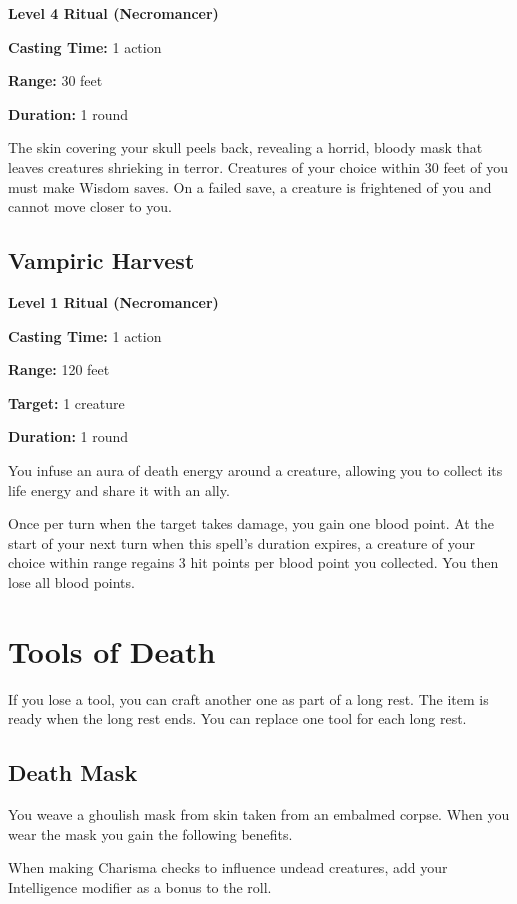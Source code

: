 \documentclass[12pt,letterpaper,twocolumn,openany,nodeprecatedcode,bg=none]{dndbook}
\begin{document}
\textbf{Level 4 Ritual (Necromancer)}

\textbf{Casting Time:} 1 action

\textbf{Range:} 30 feet

\textbf{Duration:} 1 round

The skin covering your skull peels back, revealing a horrid, bloody mask
that leaves creatures shrieking in terror. Creatures of your choice
within 30 feet of you must make Wisdom saves. On a failed save, a
creature is frightened of you and cannot move closer to you.

\subsection{Vampiric Harvest}\label{vampiric-harvest}

\textbf{Level 1 Ritual (Necromancer)}

\textbf{Casting Time:} 1 action

\textbf{Range:} 120 feet

\textbf{Target:} 1 creature

\textbf{Duration:} 1 round

You infuse an aura of death energy around a creature, allowing you to
collect its life energy and share it with an ally.

Once per turn when the target takes damage, you gain one blood point. At
the start of your next turn when this spell's duration expires, a
creature of your choice within range regains 3 hit points per blood
point you collected. You then lose all blood points.

\clearpage

\section{Tools of Death}\label{tools-of-death}

If you lose a tool, you can craft another one as part of a long rest.
The item is ready when the long rest ends. You can replace one tool for
each long rest.

\subsection{Death Mask}\label{death-mask}

You weave a ghoulish mask from skin taken from an embalmed corpse. When
you wear the mask you gain the following benefits.

When making Charisma checks to influence undead creatures, add your
Intelligence modifier as a bonus to the roll.
\end{document}
